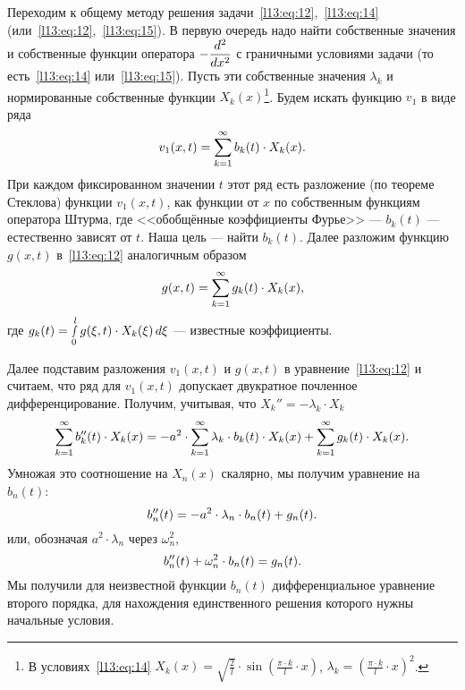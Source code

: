 Переходим к общему методу решения задачи~\eqref{l13:eq:12},~\eqref{l13:eq:14} (или~\eqref{l13:eq:12},~\eqref{l13:eq:15}). В первую очередь надо найти собственные значения и собственные функции оператора $\displaystyle-\frac{d^2}{dx^2}$ с граничными условиями задачи (то есть~\eqref{l13:eq:14} или~\eqref{l13:eq:15}). Пусть эти собственные значения $\lambda_k$ и нормированные собственные функции $X_k(x)$\footnote{В условиях~\eqref{l13:eq:14} $\displaystyle X_k(x)=\sqrt{\frac{2}{l}}\cdot\sin\left(\frac{\pi\cdot k}{l}\cdot x\right)$, $\displaystyle\lambda_k=\left(\frac{\pi\cdot k}{l}\cdot x\right)^2$.}. Будем искать функцию $v_1$ в виде ряда
\begin{equation*}
	\hfill v_1(x,t)=\sum\limits_{k=1}^{\infty}b_k(t)\cdot X_k(x).\hfill
\end{equation*}
При каждом фиксированном значении $t$ этот ряд есть разложение (по теореме Стеклова) функции $v_1(x,t)$, как функции от $x$ по собственным функциям оператора Штурма, где <<обобщённые коэффициенты Фурье>> --- $b_k(t)$ --- естественно зависят от $t$. Наша цель --- найти $b_k(t)$. Далее разложим функцию $g(x,t)$ в~\eqref{l13:eq:12} аналогичным образом
\begin{equation*}
	\hfill g(x,t)=\sum\limits_{k=1}^{\infty}g_k(t)\cdot X_k(x),\hfill
\end{equation*}
где $\displaystyle g_k(t)=\smallint\limits_0^l g(\xi,t)\cdot X_k(\xi)\,d\xi$ --- известные коэффициенты.

Далее подставим разложения $v_1(x,t)$ и $g(x,t)$ в уравнение~\eqref{l13:eq:12} и считаем, что ряд для $v_1(x,t)$ допускает двукратное почленное дифференцирование. Получим, учитывая, что $X_k''=-\lambda_k\cdot X_k$
\begin{equation*}
	\hfill\sum\limits_{k=1}^{\infty}b_k''(t)\cdot X_k(x)=-a^2\cdot\sum\limits_{k=1}^{\infty} \lambda_k\cdot b_k(t)\cdot X_k(x)+\sum\limits_{k=1}^{\infty}g_k(t)\cdot X_k(x).\hfill
\end{equation*}
Умножая это соотношение на $X_n(x)$ скалярно, мы получим уравнение на $b_n(t)$:
\begin{equation*}
	\hfill b_n''(t)=-a^2\cdot\lambda_n\cdot b_n(t)+g_n(t).\hfill
\end{equation*}
или, обозначая $a^2\cdot\lambda_n$ через $\omega_n^2$,
\begin{equation}\label{l13:eq:19}
	\hfill b_n''(t)+\omega_n^2\cdot b_n(t)=g_n(t).\hfill
\end{equation}
Мы получили для неизвестной функции $b_n(t)$ дифференциальное уравнение второго порядка, для нахождения единственного решения которого нужны начальные условия. 

